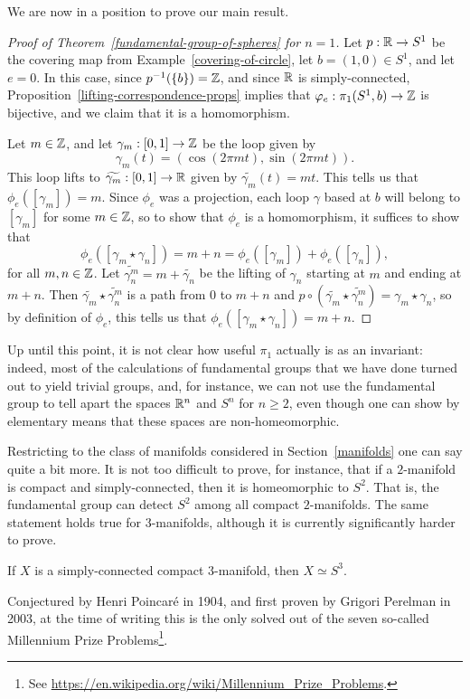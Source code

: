 We are now in a position to prove our main result.
\begin{proof}[Proof of Theorem~\ref{fundamental-group-of-spheres} for $n = 1$]
  Let $p : \mathbb{R} \to S^1$ be the covering map from Example~\ref{covering-of-circle}, let $b = (1,0) \in S^1$, and let $e = 0$. In this case, since $p^{-1}(\{b\}) = \mathbb{Z}$, and since $\mathbb{R}$ is simply-connected, Proposition~\ref{lifting-correspondence-props} implies that $\varphi_e : \pi_1(S^1,b) \to \mathbb{Z}$ is bijective, and we claim that it is a homomorphism.
  
  Let $m \in \mathbb{Z}$, and let $\gamma_m : [0,1] \to \mathbb{Z}$ be the loop given by
  \[
    \gamma_m(t) = (\cos(2\pi mt), \sin(2\pi mt)).
  \]
  This loop lifts to $\widetilde{\gamma_m} : [0,1] \to \mathbb{R}$ given by $\widetilde{\gamma_m}(t) = mt$. This tells us that $\phi_e([\gamma_m]) = m$. Since $\phi_e$ was a projection, each loop $\gamma$ based at $b$ will belong to $[\gamma_m]$ for some $m \in \mathbb{Z}$, so to show that $\phi_e$ is a homomorphism, it suffices to show that
  \[
    \phi_e([\gamma_m \star \gamma_n]) = m + n = \phi_e([\gamma_m]) + \phi_e([\gamma_n]),
  \]
  for all $m , n \in \mathbb{Z}$. Let $\widetilde{\gamma_n^m} = m + \widetilde{\gamma_n}$ be the lifting of $\gamma_n$ starting at $m$ and ending at $m+n$. Then $\widetilde{\gamma_m} \star \widetilde{\gamma_n^m}$ is a path from $0$ to $m+n$ and $p \circ (\widetilde{\gamma_m} \star \widetilde{\gamma_n^m}) = \gamma_m \star \gamma_n$, so by definition of $\phi_e$, this tells us that $\phi_e([\gamma_m \star \gamma_n]) = m+n$.
\end{proof}

Up until this point, it is not clear how useful $\pi_1$ actually is as an invariant: indeed, most of the calculations of fundamental groups that we have done turned out to yield trivial groups, and, for instance, we can not use the fundamental group to tell apart the spaces $\mathbb{R}^n$ and $S^n$ for $n \geq 2$, even though one can show by elementary means that these spaces are non-homeomorphic.

Restricting to the class of manifolds considered in Section~\ref{manifolds} one can say quite a bit more. It is not too difficult to prove, for instance, that if a $2$-manifold is compact and simply-connected, then it is homeomorphic to $S^2$. That is, the fundamental group can detect $S^2$ among all compact $2$-manifolds. The same statement holds true for $3$-manifolds, although it is currently significantly harder to prove.
\begin{thm}
  If $X$ is a simply-connected compact $3$-manifold, then $X \simeq S^3$.
\end{thm}
Conjectured by Henri Poincar{\'e} in 1904, and first proven by Grigori Perelman in 2003, at the time of writing this is the only solved out of the seven so-called Millennium Prize Problems\footnote{See \url{https://en.wikipedia.org/wiki/Millennium_Prize_Problems}.}.

